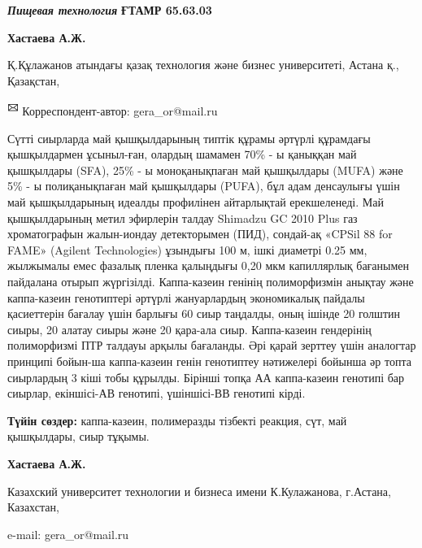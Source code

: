 \emph{{\bfseries Пищевая технология}}
\newpage
{\bfseries ҒТАМР 65.63.03}


\begin{center}

{\bfseries Хастаева А.Ж.}

Қ.Құлажанов атындағы қазақ технология және бизнес университеті, Астана қ., Қазақстан,
\end{center}

{\bfseries \textsuperscript{🖂}} Корреспондент-автор: gera\_or@mail.ru

Сүтті сиырларда май қышқылдарының типтік құрамы әртүрлі құрамдағы
қышқылдармен ұсыныл-ған, олардың шамамен 70\% - ы қаныққан май қышқылдары
(SFA), 25\% - ы моноқанықпаған май қышқылдары (MUFA) және 5\% - ы
полиқанықпаған май қышқылдары (PUFA), бұл адам денсаулығы үшін май
қышқылдарының идеалды профилінен айтарлықтай ерекшеленеді. Май
қышқылдарының метил эфирлерін талдау Shimadzu GC 2010 Plus газ
хроматографын жалын-иондау детекторымен (ПИД), сондай-ақ «CPSil 88 for
FAME» (Agilent Technologies) ұзындығы 100 м, ішкі диаметрі 0.25 мм,
жылжымалы емес фазалық пленка қалыңдығы 0,20 мкм капиллярлық бағанымен
пайдалана отырып жүргізілді. Каппа-казеин генінің полиморфизмін анықтау
және каппа-казеин генотиптері әртүрлі жануарлардың экономикалық пайдалы
қасиеттерін бағалау үшін барлығы 60 сиыр таңдалды, оның ішінде 20
голштин сиыры, 20 алатау сиыры және 20 қара-ала сиыр. Каппа-казеин
гендерінің полиморфизмі ПТР талдауы арқылы бағаланды. Әрі қарай зерттеу
үшін аналогтар принципі бойын-ша каппа-казеин генін генотиптеу нәтижелері
бойынша әр топта сиырлардың 3 кіші тобы құрылды. Бірінші топқа АА
каппа-казеин генотипі бар сиырлар, екіншісі-АВ генотипі, үшіншісі-ВВ
генотипі кірді.

{\bfseries Түйін сөздер:} каппа-казеин, полимеразды тізбекті реакция, сүт,
май қышқылдары, сиыр тұқымы.

\begin{center}

{\bfseries Хастаева А.Ж.}

Казахский университет технологии и бизнеса имени К.Кулажанова, г.Астана,
Казахстан,

e-mail: gera\_or@mail.ru
\end{center}


